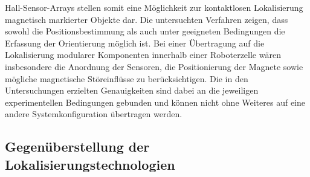 Hall-Sensor-Arrays stellen somit eine Möglichkeit zur kontaktlosen Lokalisierung magnetisch markierter Objekte dar. Die untersuchten Verfahren zeigen, dass sowohl die Positionsbestimmung als auch unter geeigneten Bedingungen die Erfassung der Orientierung möglich ist. Bei einer Übertragung auf die Lokalisierung modularer Komponenten innerhalb einer Roboterzelle wären insbesondere die Anordnung der Sensoren, die Positionierung der Magnete sowie mögliche magnetische Störeinflüsse zu berücksichtigen. Die in den Untersuchungen erzielten Genauigkeiten sind dabei an die jeweiligen experimentellen Bedingungen gebunden und können nicht ohne Weiteres auf eine andere Systemkonfiguration übertragen werden.

\subsection{Gegenüberstellung der Lokalisierungstechnologien}

